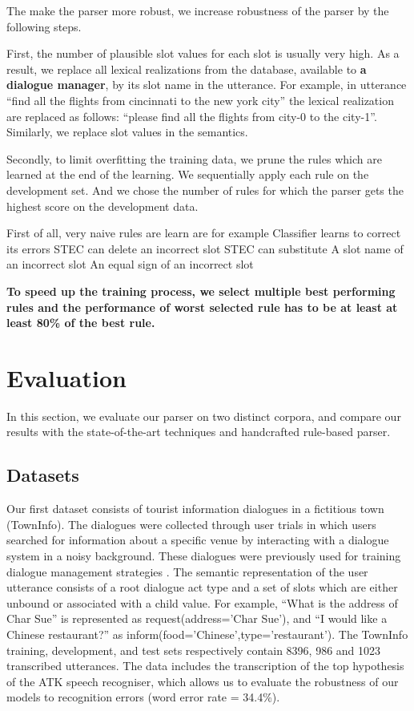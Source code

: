 \documentclass[11pt]{article}
\begin{document}
The make the parser more robust, we increase robustness of the parser by the following steps. 

First, the number of plausible slot values for each slot is usually very high. As a result, we replace all lexical realizations from the database, available to \textbf{a dialogue manager}, by its slot name in the utterance. For example, in utterance ``find all the flights from cincinnati to the new york city'' the lexical realization are replaced as follows: ``please find all the flights from city-0 to the city-1''. Similarly, we replace slot values in the semantics.

Secondly, to limit overfitting the training data, we prune the rules which are learned at the end of the learning. We sequentially apply each rule on the development set. And we chose the number of rules for which the parser gets the highest score on the development data.


First of all, very naive rules are learn are for example 
Classifier learns to correct its errors
STEC can delete an incorrect slot
STEC can substitute
A slot name of an incorrect slot
An equal sign of an incorrect slot

\textbf{To speed up the training process, we select multiple best performing rules and the performance of worst selected rule has to be at least at least 80\% of the best rule.}



\section{Evaluation} \label{sec:evaluation}

In this section, we evaluate our parser on two distinct corpora, and compare our results with the state-of-the-art techniques and handcrafted rule-based parser. 

\subsection{Datasets}

Our first dataset consists of tourist information dialogues in a fictitious
town (TownInfo). The dialogues were collected through user
trials in which users searched for information about a specific venue
by interacting with a dialogue system in a noisy background. These
dialogues were previously used for training dialogue management
strategies \cite{williams07,thomson08}. The semantic representation of the user utterance consists of a root dialogue act type and a set of slots which are either
unbound or associated with a child value. For example, ``What is
the address of Char Sue'' is represented as request(address='Char Sue'), and ``I would like a Chinese restaurant?'' as inform(food='Chinese',type='restaurant'). The TownInfo training, development, and test sets respectively contain
8396, 986 and 1023 transcribed utterances.  The data includes the transcription of the top hypothesis of the ATK speech recogniser,
which allows us to evaluate the robustness of our models to recognition
errors (word error rate = 34.4\%). 
\end{document}
